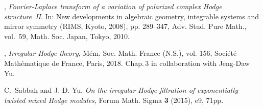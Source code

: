 \documentclass[11pt]{article}
\begin{document}
\begin{thebibliography}{CDRS18}
\bysame, \emph{Fourier-Laplace transform of a variation of polarized complex
  Hodge structure~II}. In: New developments in algebraic geometry,
  integrable systems and mirror symmetry (RIMS, Kyoto, 2008), 
pp. 289--347,  
  Adv. Stud. Pure Math., vol.~59, Math. Soc. Japan, Tokyo, 2010.
 

\bysame, \emph{Irregular Hodge theory}, M{\'e}m. Soc. Math. France (N.S.),
  vol. 156, Soci{\'e}t{\'e} Math{\'e}matique de France, Paris, 2018. Chap.\,3
  in collaboration with Jeng-Daw Yu.
 

C.~Sabbah and J.-D. Yu, \emph{On the
  irregular Hodge filtration of exponentially twisted mixed Hodge modules},
Forum Math. Sigma {\bf 3} (2015), e9, 71pp.
 
\end{thebibliography}
\end{document}
